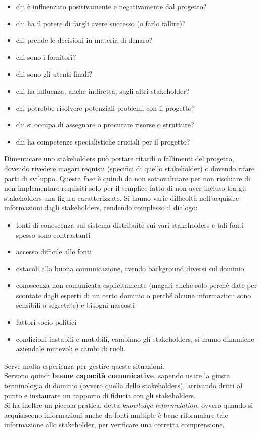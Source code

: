 \begin{itemize}
  \item chi è influenzato positivamente e negativamente dal progetto? 
  \item chi ha il potere di fargli avere successo (o farlo fallire)? 
  \item chi prende le decisioni in materia di denaro? 
  \item chi sono i fornitori? 
  \item chi sono gli utenti finali? 
  \item chi ha influenza, anche indiretta, sugli altri stakeholder? 
  \item chi potrebbe risolvere potenziali problemi con il progetto? 
  \item chi si occupa di assegnare o procurare risorse o strutture? 
  \item chi ha competenze specialistiche cruciali per il progetto?
\end{itemize}
Dimenticare uno stakeholders può portare ritardi o fallimenti del progetto, dovendo rivedere magari requisti (specifici di quello stakeholder) o dovendo rifare parti di sviluppo. Questa fase è quindi da non sottovalutare per non rischiare di non implementare requisiti solo per il semplice fatto di non aver incluso tra gli stakeholders una figura caratterizzate. Si hanno varie difficoltà nell'acquisire informazioni dagli stakeholders, rendendo complesso il dialogo:
\begin{itemize}
  \item fonti di conoscenza sul sistema distribuite sui vari stakeholders e tali fonti spesso sono contrastanti 
  \item accesso difficile alle fonti 
  \item ostacoli alla buona comunicazione, avendo background diversi sul dominio
  \item conoscenza non comunicata esplicitamente (magari anche solo perché date per scontate dagli esperti di un certo dominio o perché alcune informazioni sono sensibili o segretate) e bisogni nascosti
  \item fattori socio-politici 
  \item condizioni instabili e mutabili, cambiano gli stakeholders, si hanno dinamiche aziendale mutevoli e cambi di ruoli.
\end{itemize}
Serve molta esperienza per gestire queste situazioni.\\
Servono quindi \textbf{buone capacità comunicative}, sapendo usare la giusta terminologia di dominio (ovvero quella dello stakeholders), arrivando dritti al punto e instaurare un rapporto di fiducia con gli stakeholders.\\ Si ha inoltre un piccola pratica, detta \textit{knowledge reformulation}, ovvero quando si acquisiscono informazioni anche da fonti multiple è bene riformulare tale informazione allo stakeholder, per verificare una corretta comprensione.\\
